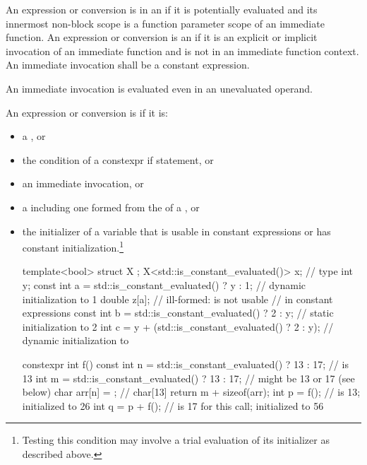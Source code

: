 \pnum
An expression or conversion is in an 
if it is potentially evaluated and
its innermost non-block scope is
a function parameter scope of an immediate function.
An expression or conversion is an 
if it is an explicit or implicit invocation of an immediate function and
is not in an immediate function context.
An immediate invocation shall be a constant expression.
\begin{note}
An immediate invocation is evaluated even in an unevaluated operand.
\end{note}

\pnum
An expression or conversion  is 
if it is:
\begin{itemize}
\item a , or
\item the condition of a constexpr if statement, or
\item an immediate invocation, or
\item a 
including one formed from the 
of a , or
\item the initializer of a variable
that is usable in constant expressions or
has constant initialization.\footnote{Testing this condition
may involve a trial evaluation of its initializer as described above.}
\begin{example}
\begin{codeblock}
template<bool> struct X {};
X<std::is_constant_evaluated()> x;                      // type 
int y;
const int a = std::is_constant_evaluated() ? y : 1;     // dynamic initialization to 1
double z[a];                                            // ill-formed:  is not usable
                                                        // in constant expressions
const int b = std::is_constant_evaluated() ? 2 : y;     // static initialization to 2
int c = y + (std::is_constant_evaluated() ? 2 : y);     // dynamic initialization to 

constexpr int f() {
  const int n = std::is_constant_evaluated() ? 13 : 17; //  is 13
  int m = std::is_constant_evaluated() ? 13 : 17;       //  might be 13 or 17 (see below)
  char arr[n] = {}; // char[13]
  return m + sizeof(arr);
}
int p = f();                                            //  is 13; initialized to 26
int q = p + f();                                        //  is 17 for this call; initialized to 56
\end{codeblock}
\end{example}
\end{itemize}

